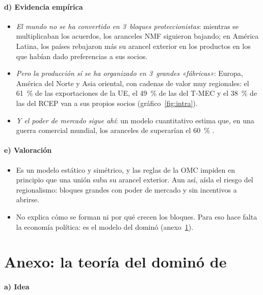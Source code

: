 \documentclass[11pt]{article}
\begin{document}
\paragraph{d) Evidencia empírica}

\begin{itemize}
\item \emph{El mundo no se ha convertido en 3~bloques proteccionistas}: mientras se multiplicaban los acuerdos, los aranceles NMF siguieron bajando; en América Latina, los países rebajaron más su arancel exterior en los productos en los que habían dado preferencias a sus socios\nocite{EstevadeordalFreundOrnelas2008}.
\item \emph{Pero la producción sí se ha organizado en 3~grandes «fábricas»}: Europa, América del Norte y Asia oriental, con cadenas de valor muy regionales\nocite{Baldwin2011Regionalism}: el 61~\% de las exportaciones de la UE, el 49~\% de las del T-MEC y el 38~\% de las del RCEP van a sus propios socios (gráfico~\ref{fig:intra}).
\item \emph{Y el poder de mercado sigue ahí}: un modelo cuantitativo estima que, en una guerra comercial mundial, los aranceles de  superarían el 60~\%\nocite{Ossa2014TradeWars} .
\end{itemize}

\paragraph{e) Valoración}

\begin{itemize}
\item Es un modelo estático y simétrico, y las reglas de la OMC impiden en principio que una unión suba su arancel exterior. Aun así, aísla el riesgo del regionalismo: bloques grandes con poder de mercado y sin incentivos a abrirse.
\item No explica cómo se forman ni por qué crecen los bloques. Para eso hace falta la economía política: es el modelo del dominó (anexo~\ref{anexo:domino}).
\end{itemize}

\section{Anexo: la teoría del dominó de }\label{anexo:domino}

\paragraph{a) Idea}
\end{document}
